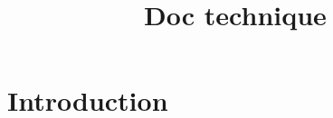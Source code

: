 \documentclass{article}
\title{Doc technique}
\begin{document}
\maketitle

\section{Introduction}
\end{document}
